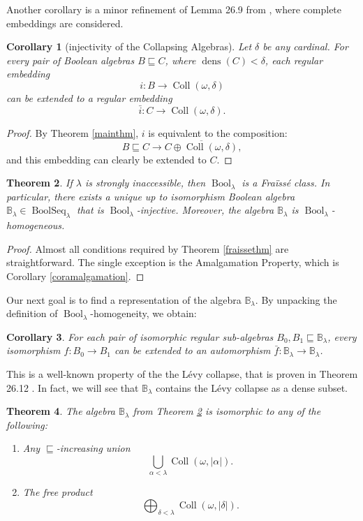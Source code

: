 \documentclass[11pt]{amsart}
\newtheorem{thm}{Theorem}[section]
\newtheorem{cor}[thm]{Corollary}
\theoremstyle{definition}
\DeclareMathOperator{\dens}{dens}
\DeclareMathOperator{\Bool}{Bool}
\DeclareMathOperator{\BoolSeq}{BoolSeq}
\newcommand{\blim}{\mathbb{B}_\lambda}
\begin{document}
Another corollary is a minor refinement of Lemma 26.9 from \cite{jech}, where complete embeddings are considered.

\begin{cor}[injectivity of the Collapsing Algebras] \label{injectivityColAlg}
	Let $\delta$ be any cardinal. For every pair of Boolean algebras $B \sqsubseteq C$, where $\dens(C)<\delta$, each regular embedding $$i:B \longrightarrow \operatorname{Coll}(\omega,\delta)$$ can be extended to a regular embedding $$\bar{i}:C \longrightarrow \operatorname{Coll}(\omega,\delta).$$
\end{cor}

\begin{proof}
	By Theorem \ref{mainthm}, $i$ is equivalent to the composition:
	$$B \sqsubseteq C \longrightarrow \overline{C\oplus \operatorname{Coll}(\omega,\delta)},$$
	and this embedding can clearly be extended to $C$.
\end{proof}

\begin{thm}\label{uniquenessthm}
    If $\lambda$ is strongly inaccessible, then $\Bool_\lambda$ is a Fra\"iss\'e class. In particular, there exists a unique up to isomorphism Boolean algebra $\blim \in \BoolSeq_\lambda$ that is $\Bool_\lambda$-injective. Moreover, the algebra $\blim$ is $\Bool_\lambda$-homogeneous.
\end{thm}
\begin{proof}
	Almost all conditions required by Theorem \ref{fraissethm} are straightforward. The single exception is the Amalgamation Property, which is Corollary \ref{coramalgamation}.
\end{proof}

Our next goal is to find a representation of the algebra $\blim.$ By unpacking the definition of $\Bool_\lambda$-homogeneity, we obtain:

\begin{cor}
	For each pair of isomorphic regular sub-algebras $B_0,B_1\sqsubseteq \blim$, every isomorphism
	$f:B_0 \longrightarrow B_1$ can be extended to an automorphism $\bar{f}:\blim \longrightarrow \blim$. 
\end{cor}

This is a well-known property of the the L\'evy collapse, that is proven in Theorem 26.12 \cite{jech}. In fact, we will see that $\blim$ contains the L\'evy collapse as a dense subset.

\begin{thm} \label{structurethm}
	The algebra $\blim$ from Theorem \ref{uniquenessthm} is isomorphic to any of the following:
    
    \begin{enumerate}
    \item Any $\sqsubseteq$-increasing union
    $$\bigcup_{\alpha<\lambda} \operatorname{Coll}(\omega,|\alpha|).$$
	\item The free product 
	$$\bigoplus_{\delta<\lambda} \operatorname{Coll}(\omega,|\delta|).$$	
    
    \end{enumerate}
\end{thm}
\end{document}
